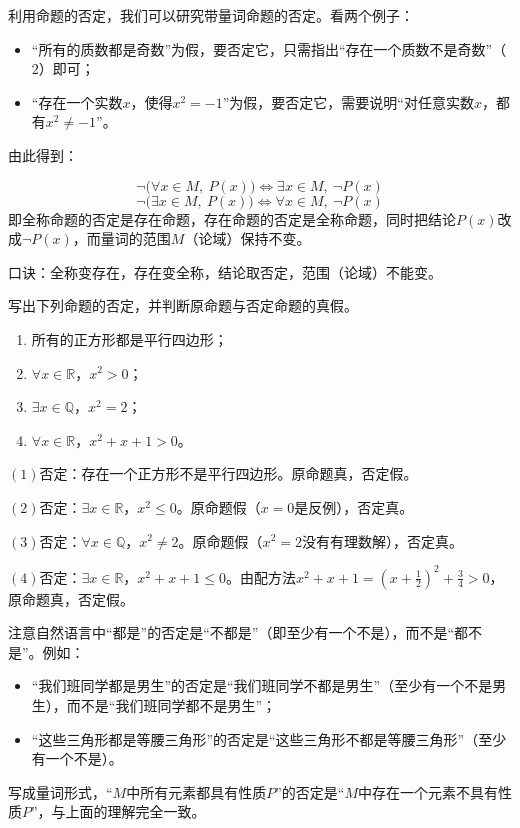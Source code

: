利用命题的否定，我们可以研究带量词命题的否定。看两个例子：
\begin{itemize}
    \item “所有的质数都是奇数”为假，要否定它，只需指出“存在一个质数不是奇数”（$2$）即可；
    \item “存在一个实数$x$，使得$x^2=-1$”为假，要否定它，需要说明“对任意实数$x$，都有$x^2\neq -1$”。
\end{itemize}
由此得到：

\begin{theorem}[含量词命题的否定]
\[\neg\big(\forall x\in M,\ P(x)\big)\iff\exists x\in M,\ \neg P(x)\]
\[\neg\big(\exists x\in M,\ P(x)\big)\iff\forall x\in M,\ \neg P(x)\]
即全称命题的否定是存在命题，存在命题的否定是全称命题，同时把结论$P(x)$改成$\neg P(x)$，而量词的范围$M$（论域）保持不变。
\end{theorem}

口诀：全称变存在，存在变全称，结论取否定，范围（论域）不能变。

\begin{example}
写出下列命题的否定，并判断原命题与否定命题的真假。
\begin{enumerate}
    \item 所有的正方形都是平行四边形；
    \item $\forall x\in\mathbb{R}$，$x^2>0$；
    \item $\exists x\in\mathbb{Q}$，$x^2=2$；
    \item $\forall x\in\mathbb{R}$，$x^2+x+1>0$。
\end{enumerate}
\end{example}
\begin{jie}
    $(1)$否定：存在一个正方形不是平行四边形。原命题真，否定假。

    $(2)$否定：$\exists x\in\mathbb{R}$，$x^2\leq 0$。原命题假（$x=0$是反例），否定真。

    $(3)$否定：$\forall x\in\mathbb{Q}$，$x^2\neq 2$。原命题假（$x^2=2$没有有理数解），否定真。

    $(4)$否定：$\exists x\in\mathbb{R}$，$x^2+x+1\leq 0$。由配方法$x^2+x+1=\left(x+\frac{1}{2}\right)^2+\frac{3}{4}>0$，原命题真，否定假。
\end{jie}

\begin{zhu}
注意自然语言中“都是”的否定是“不都是”（即至少有一个不是），而不是“都不是”。例如：
\begin{itemize}
    \item “我们班同学都是男生”的否定是“我们班同学不都是男生”（至少有一个不是男生），而不是“我们班同学都不是男生”；
    \item “这些三角形都是等腰三角形”的否定是“这些三角形不都是等腰三角形”（至少有一个不是）。
\end{itemize}
写成量词形式，“$M$中所有元素都具有性质$P$”的否定是“$M$中存在一个元素不具有性质$P$”，与上面的理解完全一致。
\end{zhu}

